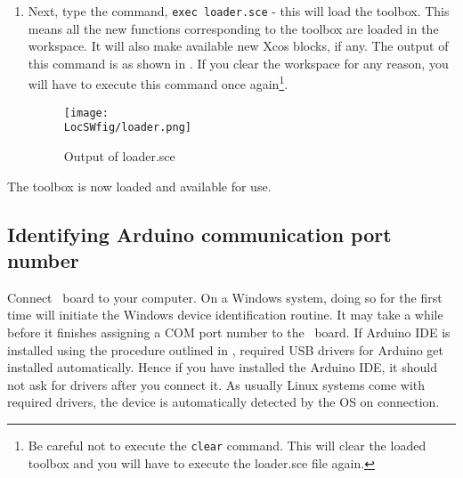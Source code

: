 \begin{enumerate}
{            exec builder.sce} - this will build the toolbox and create a file
                  {\tt loader.sce}. This step has to be executed only the first
            time. The output of this step is illustrated in .
            \begin{figure}
                  \centering
                  \texttt{[image: \\LocSWfig/builder.png]}
                  \caption{Output of builder.sce}
                  \label{builder}
            \end{figure}
      \item Next, type the command,
            {\tt exec loader.sce} -
            this will load the toolbox. This means all the new functions
            corresponding to the toolbox are loaded in the workspace. It
            will also make available new Xcos blocks, if any.  The
            output of this command is as shown in .  If you clear
            the workspace for any reason, you will have to execute this command
            once again\footnote{Be careful
                  not to execute the {\tt clear} command.  This will clear the loaded
                  toolbox and you will have to execute the loader.sce file again.}.
            \begin{figure}
                  \centering
                  \texttt{[image: \\LocSWfig/loader.png]}
                  \caption{Output of loader.sce}
                  \label{loader}
            \end{figure}
\end{enumerate}
The toolbox is now loaded and available for use. 

\subsection{Identifying Arduino communication port number}

Connect \arduino\ board to your computer. On a Windows system, doing
so for the first time will initiate the Windows device identification
routine. It may take a while before it finishes assigning a COM port
number to the \arduino\ board.  If Arduino IDE is installed using the
procedure outlined in , required USB drivers for
Arduino get installed automatically.  Hence if you have installed the
Arduino IDE, it should not ask for drivers after you connect it.  As
usually Linux systems come with required drivers, the device is
automatically detected by the OS on connection.

